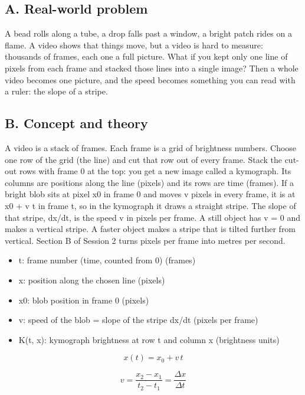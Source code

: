 \documentclass[11pt,a4paper]{article}
\begin{document}
\subsection*{A. Real-world problem}
A bead rolls along a tube, a drop falls past a window, a bright patch rides on a flame. A video shows that things move, but a video is hard to measure: thousands of frames, each one a full picture. What if you kept only one line of pixels from each frame and stacked those lines into a single image? Then a whole video becomes one picture, and the speed becomes something you can read with a ruler: the slope of a stripe.

\subsection*{B. Concept and theory}
A video is a stack of frames. Each frame is a grid of brightness numbers. Choose one row of the grid (the line) and cut that row out of every frame. Stack the cut-out rows with frame 0 at the top: you get a new image called a kymograph. Its columns are positions along the line (pixels) and its rows are time (frames). If a bright blob sits at pixel x0 in frame 0 and moves v pixels in every frame, it is at x0 + v t in frame t, so in the kymograph it draws a straight stripe. The slope of that stripe, dx/dt, is the speed v in pixels per frame. A still object has v = 0 and makes a vertical stripe. A faster object makes a stripe that is tilted further from vertical. Section B of Session 2 turns pixels per frame into metres per second.

\begin{itemize}[nosep]
\item t: frame number (time, counted from 0) (frames)
\item x: position along the chosen line (pixels)
\item x0: blob position in frame 0 (pixels)
\item v: speed of the blob = slope of the stripe dx/dt (pixels per frame)
\item K(t, x): kymograph brightness at row t and column x (brightness units)
\end{itemize}

\begin{equation*}
x(t)=x_0+v\,t
\end{equation*}

\begin{equation*}
v=\frac{x_2-x_1}{t_2-t_1}=\frac{\Delta x}{\Delta t}
\end{equation*}
\end{document}
